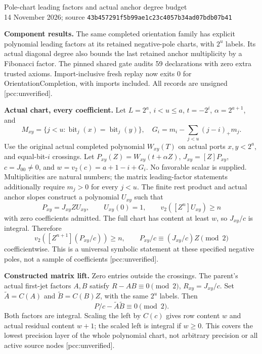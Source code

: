 \documentclass[10pt]{article}
\begin{document}
\begin{center}
{\Large Pole-chart leading factors and actual anchor degree budget}\\[4pt]
14 November 2026; source \texttt{43b457291f5b99ae1c23c4057b34ad07bdb07b41}
\end{center}
\textbf{Component results.} The same completed orientation family has
explicit polynomial leading factors at its retained negative-pole charts,
with $2^u$ labels. Its actual diagonal degree also bounds the last retained
anchor multiplicity by a Fibonacci factor. The pinned shared gate audits
59 declarations with zero extra trusted axioms. Import-inclusive fresh
replay now exits 0 for OrientationCompletion, with imports included.
All records are unsigned [pcc:unverified].

\textbf{Actual chart, every coefficient.} Let $L=2^a$, $i<u\le a$,
$t=-2^i$, $\alpha=2^{a+1}$, and
\[
 M_{xy}=\{j<u:\operatorname{bit}_j(x)=\operatorname{bit}_j(y)\},\quad
 G_i=m_i-\sum_{j<u}(j-i)_+m_j.
\]
Use the original actual completed polynomial $W_{xy}(T)$ on actual ports
$x,y<2^a$, and equal-bit-$i$ crossings. Let $P_{xy}(Z)=W_{xy}(t+\alpha Z)$,
$J_{xy}=[Z]P_{xy}$, $c=J_{00}\ne0$, and
$w=v_2(c)=a+1-i+G_i$. No favorable scalar is supplied. Multiplicities are natural numbers; the
matrix leading-factor statements additionally require $m_j>0$ for every
$j<u$.
The finite rest product and actual anchor slopes construct a polynomial
$U_{xy}$ such that
\[
 P_{xy}=J_{xy}Z U_{xy},\qquad U_{xy}(0)=1,\qquad
 v_2([Z^n]U_{xy})\ge n
\]
with zero coefficients admitted. The full chart has content at least $w$,
so $J_{xy}/c$ is integral. Therefore
\[
 v_2([Z^{n+1}](P_{xy}/c))\ge n,\qquad
 P_{xy}/c\equiv (J_{xy}/c)Z\pmod 2
\]
coefficientwise. This is a universal symbolic statement at these specified
negative poles, not a sample of coefficients [pcc:unverified].

\textbf{Constructed matrix lift.} Zero entries outside the crossings.
The parent's actual first-jet factors $A,B$ satisfy $R-AB\equiv0\pmod2$,
$R_{xy}=J_{xy}/c$. Set $\widetilde A=C(A)$ and
$\widetilde B=C(B)Z$, with the same $2^u$ labels. Then
\[
 P/c-\widetilde A\widetilde B\equiv0\pmod2.
\]
Both factors are integral. Scaling the left by $C(c)$ gives row content
$w$ and actual residual content $w+1$; the scaled left is integral if
$w\ge0$. This covers the lowest precision layer of the whole polynomial
chart, not arbitrary precision or all active source nodes [pcc:unverified].
\end{document}
